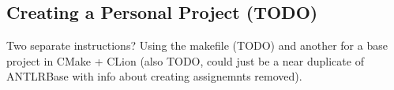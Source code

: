 \documentclass[../setup.tex]{subfiles}
\begin{document}
\subsection{Creating a Personal Project (TODO)}
Two separate instructions? Using the makefile (TODO) and another for a base project in CMake +
CLion (also TODO, could just be a near duplicate of ANTLRBase with info about creating assignemnts
removed).
\end{document}
